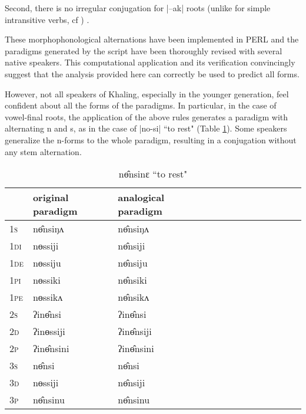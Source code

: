 \documentclass[twoside,a4paper,11pt]{article}
\newcommand{\ipa}[1]{{\phon#1}}
\newcommand{\grise}[1]{\cellcolor{lightgray}\textbf{#1}}
\begin{document}
Second, there is no irregular conjugation for |\ipa{--ak}| roots (unlike for simple intransitive verbs, cf \citealt[1115]{jacques12khaling}) .

These morphophonological alternations have been implemented in PERL and the paradigms generated by the script have been thoroughly revised with several native speakers. This computational application and its  verification convincingly suggest that the analysis provided here can correctly be used to predict  all forms. 


However, not all speakers of Khaling, especially in the younger generation, feel confident about all the forms of the paradigms.  %
In particular, in the case of vowel-final roots, the application of the above rules generates a paradigm with alternating \ipa{n} and \ipa{s}, as in the case of |\ipa{no-si}| ``to rest" (Table \ref{tab:no}). Some speakers generalize the \ipa{n}-forms to the whole paradigm, resulting in a conjugation without any stem alternation.

\begin{table}[H]
 \centering 
\caption{ \ipa{nɵ̂nsinɛ}  ``to rest"  } \label{tab:no}
\begin{tabular}{l|l|l|l|l|l|l|l|l|l|l|l|l}  \toprule
&original paradigm& analogical paradigm \\
\midrule
\textsc{1s} & \ipa{nɵ̂nsiŋʌ} &\ipa{nɵ̂nsiŋʌ} \\ 
\textsc{1di} & \ipa{nɵssiji} &\ipa{nɵ̂nsiji} \grise{}  \\
\textsc{1de} & \ipa{nɵssiju} & \ipa{nɵ̂nsiju} \grise{}  \\ 
\textsc{1pi} & \ipa{nɵssiki} & \ipa{nɵ̂nsiki}  \grise{} \\ 
\textsc{1pe} & \ipa{nɵssikʌ} & \ipa{nɵ̂nsikʌ} \grise{}  \\ 
\textsc{2s} & \ipa{ʔinɵ̂nsi} & \ipa{ʔinɵ̂nsi}   \\ 
\textsc{2d} & \ipa{ʔinɵssiji} & \ipa{ʔinɵ̂nsiji}  \grise{}  \\
\textsc{2p} & \ipa{ʔinɵ̂nsini}  & \ipa{ʔinɵ̂nsini}    \\ 
\textsc{3s} & \ipa{nɵ̂nsi} & \ipa{nɵ̂nsi}   \\ 
\textsc{3d} & \ipa{nɵssiji} & \ipa{nɵ̂nsiji}  \grise{} \\ 
\textsc{3p} & \ipa{nɵ̂nsinu}  & \ipa{nɵ̂nsinu} \\ 
\bottomrule
\end{tabular}
\end{table}
\end{document}
